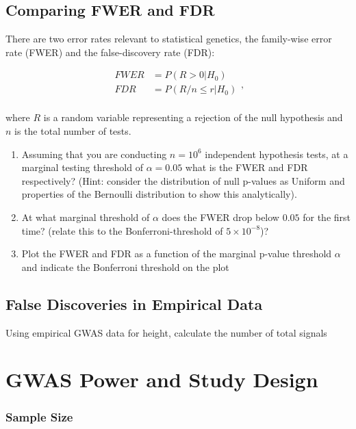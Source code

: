 \documentclass{pset}
\begin{document}
\subsection*{Comparing FWER and FDR}

There are two error rates relevant to statistical genetics, the family-wise error rate (FWER) and the false-discovery rate (FDR):

$$
\begin{aligned}
FWER &= P(R > 0 | H_0)\\
FDR &= P(R/n \leq r | H_0)\\
\end{aligned},
$$

where $R$ is a random variable representing a rejection of the null hypothesis and $n$ is the total number of tests. 

\begin{enumerate}
\item Assuming that you are conducting $n=10^6$ independent hypothesis tests, at a marginal testing threshold of $\alpha = 0.05$ what is the FWER and FDR respectively?  (Hint: consider the distribution of null p-values as Uniform and properties of the Bernoulli distribution to show this analytically).

\item At what marginal threshold of $\alpha$ does the FWER drop below $0.05$ for the first time? (relate this to the Bonferroni-threshold of $5\times 10^{-8}$)? 
\item Plot the FWER and FDR as a function of the marginal p-value threshold $\alpha$ and indicate the Bonferroni threshold on the plot

\end{enumerate}

\subsection*{False Discoveries in Empirical Data}

Using empirical GWAS data for height, calculate the number of total signals 

\section*{GWAS Power and Study Design}

\subsubsection*{Sample Size}
\end{document}
